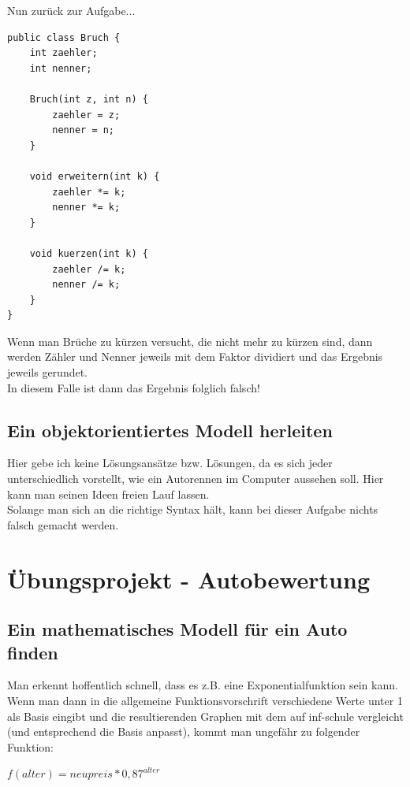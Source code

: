 \documentclass{scrartcl}   %
\begin{document}
Nun zurück zur Aufgabe...

\newpage

\begin{lstlisting}
public class Bruch {
    int zaehler;
    int nenner;
    
    Bruch(int z, int n) {
        zaehler = z;
        nenner = n;
    }
    
    void erweitern(int k) {
        zaehler *= k;
        nenner *= k;
    }
    
    void kuerzen(int k) {
        zaehler /= k;
        nenner /= k;
    }
}
\end{lstlisting}

Wenn man Brüche zu kürzen versucht, die nicht mehr zu kürzen sind, dann werden Zähler und Nenner jeweils mit dem Faktor dividiert und das Ergebnis jeweils gerundet.\\
In diesem Falle ist dann das Ergebnis folglich falsch!

\subsection{Ein objektorientiertes Modell herleiten}

Hier gebe ich keine Lösungsansätze bzw. Lösungen, da es sich jeder unterschiedlich vorstellt, wie ein Autorennen im Computer aussehen soll. Hier kann man seinen Ideen freien Lauf lassen.\\
Solange man sich an die richtige Syntax hält, kann bei dieser Aufgabe nichts falsch gemacht werden.

\newpage

\section{Übungsprojekt - Autobewertung}

\subsection{Ein mathematisches Modell für ein Auto finden}

Man erkennt hoffentlich schnell, dass es z.B. eine Exponentialfunktion sein kann.\\
Wenn man dann in die allgemeine Funktionsvorschrift verschiedene Werte unter 1 als Basis eingibt und die resultierenden Graphen mit dem auf inf-schule vergleicht (und entsprechend die Basis anpasst), kommt man ungefähr zu folgender Funktion:

\begin{center}
    \texttt{$f(alter) = neupreis * 0,87^{ alter}$}
\end{center}
\end{document}
